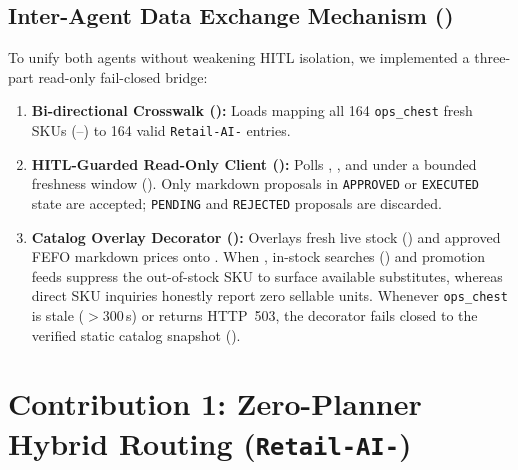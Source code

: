 \subsection*{Inter-Agent Data Exchange Mechanism ()}
To unify both agents without weakening HITL isolation, we implemented a three-part read-only fail-closed bridge:
\begin{enumerate}
    \item \textbf{Bi-directional Crosswalk ():} Loads  mapping all 164 \texttt{ops\_chest} fresh SKUs (--) to 164 valid \texttt{Retail-AI-}  entries.
    \item \textbf{HITL-Guarded Read-Only Client ():} Polls , , and  under a bounded freshness window (). Only markdown proposals in \texttt{APPROVED} or \texttt{EXECUTED} state are accepted; \texttt{PENDING} and \texttt{REJECTED} proposals are discarded.
    \item \textbf{Catalog Overlay Decorator ():} Overlays fresh live stock () and approved FEFO markdown prices onto . When , in-stock searches () and promotion feeds suppress the out-of-stock SKU to surface available substitutes, whereas direct SKU inquiries honestly report zero sellable units. Whenever \texttt{ops\_chest} is stale ($>300$\,s) or returns HTTP~503, the decorator fails closed to the verified static catalog snapshot ().
\end{enumerate}

\section{Contribution 1: Zero-Planner Hybrid Routing (\texttt{Retail-AI-})}

